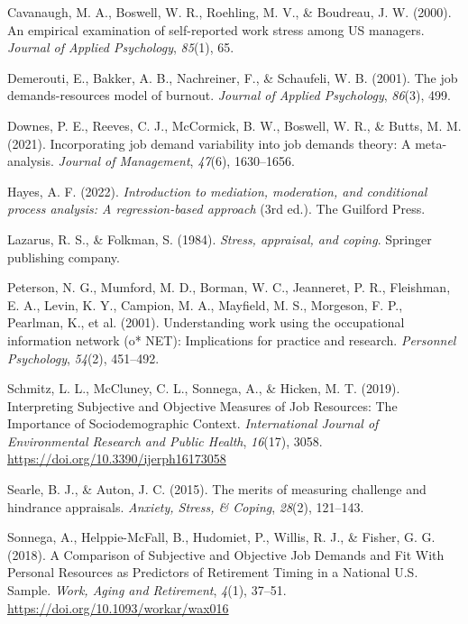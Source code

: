 \documentclass[
  man]{apa6}
\newlength{\cslhangindent}
\newlength{\cslentryspacingunit} %
\newenvironment{CSLReferences}[2] %
 {%
  \setlength{\parindent}{0pt}
  \ifodd #1
  \let\oldpar\par
  \def\par{\hangindent=\cslhangindent\oldpar}
  \fi
  \setlength{\parskip}{#2\cslentryspacingunit}
 }%
 {}
\begin{document}
\begin{CSLReferences}{1}{0}
\leavevmode{}%
Cavanaugh, M. A., Boswell, W. R., Roehling, M. V., \& Boudreau, J. W. (2000). An empirical examination of self-reported work stress among US managers. \emph{Journal of Applied Psychology}, \emph{85}(1), 65.

\leavevmode{}%
Demerouti, E., Bakker, A. B., Nachreiner, F., \& Schaufeli, W. B. (2001). The job demands-resources model of burnout. \emph{Journal of Applied Psychology}, \emph{86}(3), 499.

\leavevmode{}%
Downes, P. E., Reeves, C. J., McCormick, B. W., Boswell, W. R., \& Butts, M. M. (2021). Incorporating job demand variability into job demands theory: A meta-analysis. \emph{Journal of Management}, \emph{47}(6), 1630--1656.

\leavevmode{}%
Hayes, A. F. (2022). \emph{Introduction to mediation, moderation, and conditional process analysis: A regression-based approach} (3rd ed.). The Guilford Press.

\leavevmode{}%
Lazarus, R. S., \& Folkman, S. (1984). \emph{Stress, appraisal, and coping}. Springer publishing company.

\leavevmode{}%
Peterson, N. G., Mumford, M. D., Borman, W. C., Jeanneret, P. R., Fleishman, E. A., Levin, K. Y., Campion, M. A., Mayfield, M. S., Morgeson, F. P., Pearlman, K., et al. (2001). Understanding work using the occupational information network (o* NET): Implications for practice and research. \emph{Personnel Psychology}, \emph{54}(2), 451--492.

\leavevmode{}%
Schmitz, L. L., McCluney, C. L., Sonnega, A., \& Hicken, M. T. (2019). Interpreting {Subjective} and {Objective} {Measures} of {Job} {Resources}: {The} {Importance} of {Sociodemographic} {Context}. \emph{International Journal of Environmental Research and Public Health}, \emph{16}(17), 3058. \url{https://doi.org/10.3390/ijerph16173058}

\leavevmode{}%
Searle, B. J., \& Auton, J. C. (2015). The merits of measuring challenge and hindrance appraisals. \emph{Anxiety, Stress, \& Coping}, \emph{28}(2), 121--143.

\leavevmode{}%
Sonnega, A., Helppie-McFall, B., Hudomiet, P., Willis, R. J., \& Fisher, G. G. (2018). A {Comparison} of {Subjective} and {Objective} {Job} {Demands} and {Fit} {With} {Personal} {Resources} as {Predictors} of {Retirement} {Timing} in a {National} {U}.{S}. {Sample}. \emph{Work, Aging and Retirement}, \emph{4}(1), 37--51. \url{https://doi.org/10.1093/workar/wax016}


\end{CSLReferences}
\end{document}

